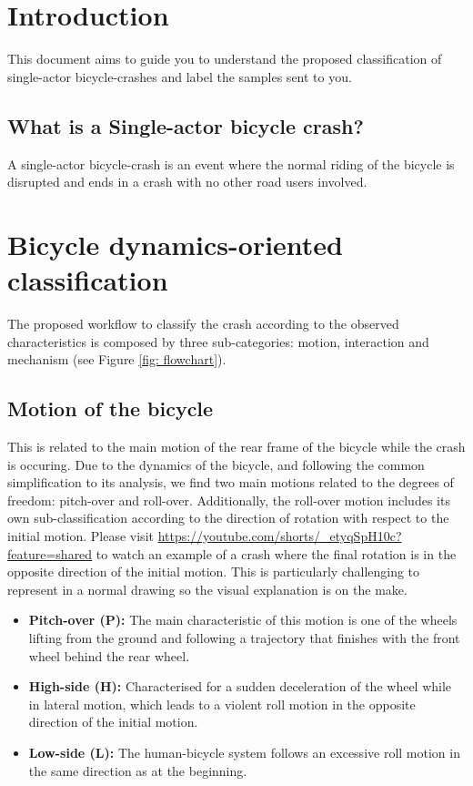 \documentclass{article}
\begin{document}
\section{Introduction}

This document aims to guide you to understand the proposed classification \cite{Jac04} of single-actor bicycle-crashes and label the samples sent to you.

\subsection{What is a Single-actor bicycle crash?}

A single-actor bicycle-crash is an event where the normal riding of the bicycle is disrupted and ends in a crash with no other road users involved.

\section{Bicycle dynamics-oriented classification}

The proposed workflow to classify the crash according to the observed characteristics is composed by three sub-categories: motion, interaction and mechanism (see Figure \ref{fig: flowchart}).

\subsection{Motion of the bicycle}

This is related to the main motion of the rear frame of the bicycle while the crash is occuring.
%
Due to the dynamics of the bicycle, and following the common simplification to its analysis, we find two main motions related to the degrees of freedom: pitch-over and roll-over.
%
Additionally, the roll-over motion includes its own sub-classification according to the direction of rotation with respect to the initial motion.
% 
Please visit \url{https://youtube.com/shorts/_etyqSpH10c?feature=shared} to watch an example of a crash where the final rotation is in the opposite direction of the initial motion.
%
This is particularly challenging to represent in a normal drawing so the visual explanation is on the make.

\begin{itemize}
    \item \textbf{Pitch-over (P):} The main characteristic of this motion is one of the wheels lifting from the ground and following a trajectory that finishes with the front wheel behind the rear wheel.
    \item \textbf{High-side (H):} Characterised for a sudden deceleration of the wheel while in lateral motion, which leads to a violent roll motion in the opposite direction of the initial motion.
    \item \textbf{Low-side (L):} The human-bicycle system follows an excessive roll motion in the same direction as at the beginning.
\end{itemize}
\end{document}
